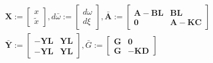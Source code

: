 $$
\begin{array}{l}
\mathbf{X}:=\left[\begin{array}{l}
x \\
\tilde{x}
\end{array}\right], d \bar{\omega} :=\left[\begin{array}{c}
d \omega \\
d \xi
\end{array}\right], \bar{\mathbf{A}} :=\left[\begin{array}{cc}
\mathbf{A}-\mathbf{B} \mathbf{L} & \mathbf{B} \mathbf{L} \\
\mathbf{0} & \mathbf{A}-\mathbf{K} \mathbf{C}
\end{array}\right] \\
\bar{\mathbf{Y}} :=\left[\begin{array}{cc}
-\mathbf{Y} \mathbf{L} & \mathbf{Y} \mathbf{L} \\
-\mathbf{Y} \mathbf{L} & \mathbf{Y} \mathbf{L}
\end{array}\right], \bar{G} :=\left[\begin{array}{cc}
\mathbf{G} & \mathbf{0} \\
\mathbf{G} & -\mathbf{K} \mathbf{D}
\end{array}\right]
\end{array}
$$